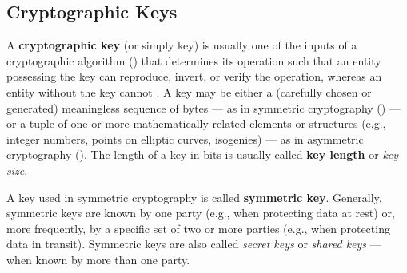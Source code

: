 \subsection{Cryptographic Keys}\label{sec:cryptography_basics:keys}

A \textbf{cryptographic key} (or simply key) is usually one of the inputs of a cryptographic algorithm () that determines its operation such that an entity possessing the key can reproduce, invert, or verify the operation, whereas an entity without the key cannot \cite{barker_recommendation_2020_p1}. A key may be either a (carefully chosen or generated) meaningless sequence of bytes --- as in symmetric cryptography () --- or a tuple of one or more mathematically related elements or structures (e.g., integer numbers, points on elliptic curves, isogenies) --- as in asymmetric cryptography (). The length of a key in bits is usually called \textbf{key length} or \textit{key size}.

A key used in symmetric cryptography is called \textbf{symmetric key}. Generally, symmetric keys are known by one party (e.g., when protecting data at rest) or, more frequently, by a specific set of two or more parties (e.g., when protecting data in transit). Symmetric keys are also called \textit{secret keys} or \textit{shared keys} --- when known by more than one party. 


